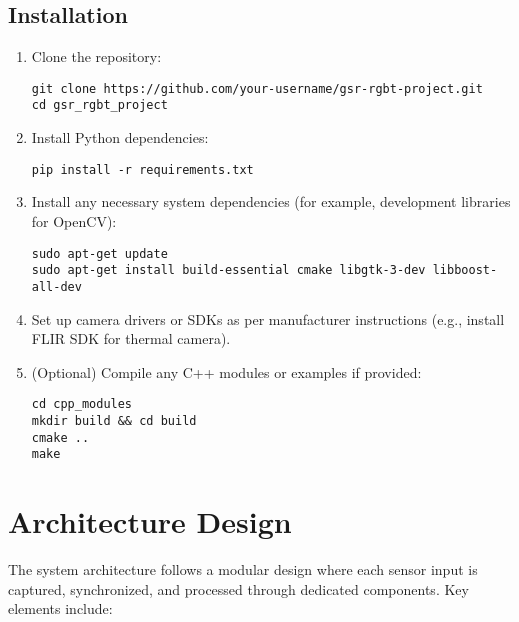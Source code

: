 \documentclass{article}
\begin{document}
    \subsection{Installation}

    \begin{enumerate}
        \item Clone the repository:
        \begin{verbatim}
git clone https://github.com/your-username/gsr-rgbt-project.git
cd gsr_rgbt_project
        \end{verbatim}
        \item Install Python dependencies:
        \begin{verbatim}
pip install -r requirements.txt
        \end{verbatim}
        \item Install any necessary system dependencies (for example, development libraries for OpenCV):
        \begin{verbatim}
sudo apt-get update
sudo apt-get install build-essential cmake libgtk-3-dev libboost-all-dev
        \end{verbatim}
        \item Set up camera drivers or SDKs as per manufacturer instructions (e.g., install FLIR SDK for thermal camera).
        \item (Optional) Compile any C++ modules or examples if provided:
        \begin{verbatim}
cd cpp_modules
mkdir build && cd build
cmake ..
make
        \end{verbatim}
    \end{enumerate}


    \section{Architecture Design}

    The system architecture follows a modular design where each sensor input is captured, synchronized, and processed through dedicated components. Key elements include:
\end{document}
